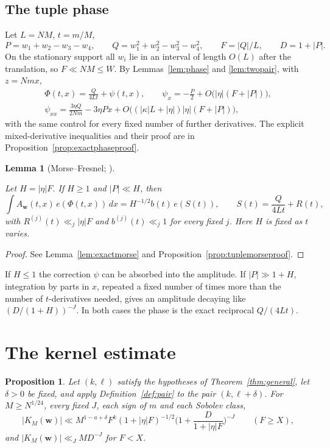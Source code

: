 \documentclass[11pt]{amsart}
\newtheorem{proposition}[theorem]{Proposition}
\newtheorem{lemma}[theorem]{Lemma}
\theoremstyle{definition}
\theoremstyle{remark}
\numberwithin{equation}{section}
\begin{document}
\subsection{The tuple phase}
Let $L=NM$, $t=m/M$,
\[
P=w_1+w_2-w_3-w_4,\qquad Q=w_1^2+w_2^2-w_3^2-w_4^2,\qquad F=|Q|/L,\qquad D=1+|P|.
\]
On the stationary support all $w_i$ lie in an interval of length $O(L)$ after the translation, so $F\ll NM\le W$. By Lemmas~\ref{lem:phase} and \ref{lem:twopair}, with $z=Nmx$,
\begin{equation}\label{eq:psi}
\begin{gathered}
\Phi(t,x)=\frac{Q}{4Lt}+\psi(t,x),\qquad
\psi_x=-\frac P2+O\big(|\eta|(F+|P|)\big),\\
\psi_{xx}=\frac{3\eta Q}{2Nm}-3\eta Px+O\big((|\kappa|L+|\eta|)|\eta|(F+|P|)\big),
\end{gathered}
\end{equation}
with the same control for every fixed number of further derivatives. The explicit mixed-derivative inequalities and their proof are in Proposition~\ref{prop:exactphaseproof}.

\begin{lemma}[Morse--Fresnel; {\cite[\S3]{B38}}]\label{lem:morse}

Let $H=|\eta|F$. If $H\ge1$ and $|P|\ll H$, then
\[
\int A_{\mathbf w}(t,x)\,e(\Phi(t,x))\,dx=H^{-1/2}b(t)\,e(S(t)),\qquad
S(t)=\frac Q{4Lt}+R(t),
\]
with $R^{(j)}(t)\ll_j|\eta|F$ and $b^{(j)}(t)\ll_j1$ for every fixed $j$. Here $H$ is fixed as $t$ varies.
\end{lemma}
\begin{proof}
See Lemma~\ref{lem:exactmorse} and Proposition~\ref{prop:tuplemorseproof}.
\end{proof}

If $H\le1$ the correction $\psi$ can be absorbed into the amplitude. If $|P|\gg1+H$, integration by parts in $x$, repeated a fixed number of times more than the number of $t$-derivatives needed, gives an amplitude decaying like $(D/(1+H))^{-J}$. In both cases the phase is the exact reciprocal $Q/(4Lt)$.

\section{The kernel estimate}\label{sec:kernel}

\begin{proposition}\label{prop:kernel}
Let $(k,\ell)$ satisfy the hypotheses of Theorem~\ref{thm:general}, let $\delta>0$ be fixed, and apply Definition~\ref{def:pair} to the pair $(k,\ell+\delta)$. For $M\ge N^{1/24}$, every fixed $J$, each sign of $m$ and each Sobolev class,
\begin{equation}\label{eq:kernel}
|K_M(\mathbf w)|\ll M^{1-a+\delta}F^{k}(1+|\eta|F)^{-1/2}\Big(1+\frac D{1+|\eta|F}\Big)^{-J}\qquad(F\ge X),
\end{equation}
and $|K_M(\mathbf w)|\ll_J MD^{-J}$ for $F<X$.
\end{proposition}
\end{document}
